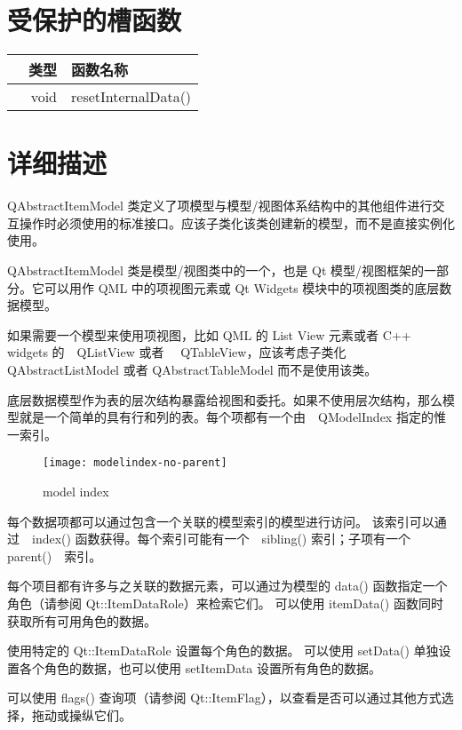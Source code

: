 \section{受保护的槽函数}

\splitLine

\begin{tabular}{|r|l|}
\hline
类型　	&函数名称\\
\hline
void	&resetInternalData()\\
\hline
\end{tabular}

\section{详细描述}

\splitLine

QAbstractItemModel 类定义了项模型与模型/视图体系结构中的其他组件进行交互操作时必须使用的标准接口。应该子类化该类创建新的模型，而不是直接实例化使用。

QAbstractItemModel 类是模型/视图类中的一个，也是 Qt 模型/视图框架的一部分。它可以用作 QML 中的项视图元素或 Qt Widgets 模块中的项视图类的底层数据模型。

如果需要一个模型来使用项视图，比如 QML 的 List View 元素或者 C++ widgets 的　QListView 或者　 QTableView，应该考虑子类化 QAbstractListModel 或者 QAbstractTableModel 而不是使用该类。

底层数据模型作为表的层次结构暴露给视图和委托。如果不使用层次结构，那么模型就是一个简单的具有行和列的表。每个项都有一个由　QModelIndex 指定的惟一索引。

\begin{figure}[hbt!]  
	\centering
    \texttt{[image: modelindex-no-parent]}
	\caption{model index}
\end{figure}

每个数据项都可以通过包含一个关联的模型索引的模型进行访问。
该索引可以通过　index() 函数获得。每个索引可能有一个　sibling() 索引；子项有一个 parent()　索引。

每个项目都有许多与之关联的数据元素，可以通过为模型的 data() 函数指定一个角色（请参阅 Qt::ItemDataRole）来检索它们。
可以使用 itemData() 函数同时获取所有可用角色的数据。

使用特定的 Qt::ItemDataRole 设置每个角色的数据。
可以使用 setData() 单独设置各个角色的数据，也可以使用 setItemData 设置所有角色的数据。

可以使用 flags() 查询项（请参阅 Qt::ItemFlag），以查看是否可以通过其他方式选择，拖动或操纵它们。

